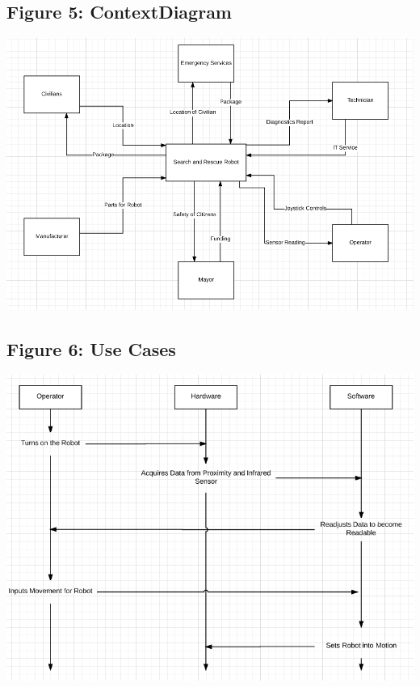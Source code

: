 \documentclass{article}
\begin{document}
\subsection{Figure 5: ContextDiagram}
\begin{center}{\includegraphics[width=\textwidth]{ContextDiagram.png}}\end{center}

\subsection{Figure 6: Use Cases}
\begin{center}{ \includegraphics[width=\textwidth]{SearchCase.png}}\end{center}
\end{document}
